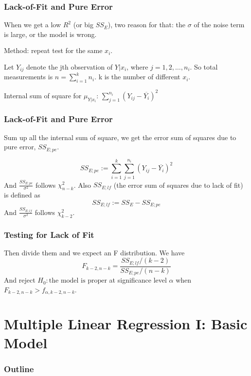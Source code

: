 \documentclass{beamer}
\begin{document}
\begin{frame}
    \frametitle{Lack-of-Fit and Pure Error}

    When we get a low $R^2$ (or big $SS_{E}$), two reason for that: the $\sigma$ of the noise term is large, or the model is wrong. \par
    Method: repeat test for the same $x_i$.\par
    Let $Y_{ij}$ denote the jth observation of $Y|x_i$, where $j=1,2,\dots , n_i$. So total measurements is $n=\sum\limits_{i=1}^{k} n_i$. k is the number of different $x_i$.\par
    Internal sum of square for $\mu_{Y|x_i}$: $\sum\limits_{j=1}^{n_i}(Y_{ij}-\overline{Y_i})^2$

\end{frame}

\begin{frame}
    \frametitle{Lack-of-Fit and Pure Error}

    Sum up all the internal sum of square, we get the error sum of squares due to pure error, $SS_{E;pe}$.\par
    \[SS_{E;pe}:=\sum\limits_{i=1}^{k}\sum\limits_{j=1}^{n_i}(Y_{ij}-\overline{Y_i})^2\]
    And $\frac{SS_{E;pe}}{\sigma^2}$ follows $\chi^2_{n-k}$. Also $SS_{E;lf}$ (the error sum of squares due to lack of fit) is defined as
    \[SS_{E;lf}:=SS_E-SS_{E;pe}\]
    And $\frac{SS_{E;lf}}{\sigma^2}$ follows $\chi^2_{k-2}$.

\end{frame}

\begin{frame}
    \frametitle{Testing for Lack of Fit}

    Then divide them and we expect an F distribution. We have 
    \[F_{k-2,n-k}=\frac{SS_{E;lf}/(k-2)}{SS_{E;pe}/(n-k)}\]
    And reject $H_0: \text{the model is proper}$ at significance level $\alpha$ when $F_{k-2,n-k}>f_{\alpha,k-2,n-k}$.

\end{frame}

\section{Multiple Linear Regression I: Basic Model}
\begin{frame}
    \frametitle{Outline}
    \tableofcontents[currentsection]
\end{frame}
\end{document}
